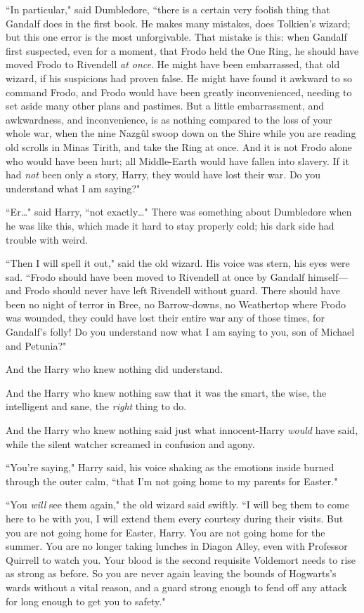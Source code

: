 ``In particular," said Dumbledore, ``there is a certain very foolish thing that Gandalf does in the first book. He makes many mistakes, does Tolkien's wizard; but this one error is the most unforgivable. That mistake is this: when Gandalf first suspected, even for a moment, that Frodo held the One Ring, he should have moved Frodo to Rivendell \emph{at once}. He might have been embarrassed, that old wizard, if his suspicions had proven false. He might have found it awkward to so command Frodo, and Frodo would have been greatly inconvenienced, needing to set aside many other plans and pastimes. But a little embarrassment, and awkwardness, and inconvenience, is as nothing compared to the loss of your whole war, when the nine Nazgûl swoop down on the Shire while you are reading old scrolls in Minas Tirith, and take the Ring at once. And it is not Frodo alone who would have been hurt; all Middle-Earth would have fallen into slavery. If it had \emph{not} been only a story, Harry, they would have lost their war. Do you understand what I am saying?"

``Er{\ldots}" said Harry, ``not exactly{\ldots}" There was something about Dumbledore when he was like this, which made it hard to stay properly cold; his dark side had trouble with weird.

``Then I will spell it out," said the old wizard. His voice was stern, his eyes were sad. ``Frodo should have been moved to Rivendell at once by Gandalf himself—and Frodo should never have left Rivendell without guard. There should have been no night of terror in Bree, no Barrow-downs, no Weathertop where Frodo was wounded, they could have lost their entire war any of those times, for Gandalf's folly! Do you understand now what I am saying to you, son of Michael and Petunia?"

And the Harry who knew nothing did understand.

And the Harry who knew nothing saw that it was the smart, the wise, the intelligent and sane, the \emph{right} thing to do.

And the Harry who knew nothing said just what innocent-Harry \emph{would} have said, while the silent watcher screamed in confusion and agony.

``You're saying," Harry said, his voice shaking as the emotions inside burned through the outer calm, ``that I'm not going home to my parents for Easter."

``You \emph{will} see them again," the old wizard said swiftly. ``I will beg them to come here to be with you, I will extend them every courtesy during their visits. But you are not going home for Easter, Harry. You are not going home for the summer. You are no longer taking lunches in Diagon Alley, even with Professor Quirrell to watch you. Your blood is the second requisite Voldemort needs to rise as strong as before. So you are never again leaving the bounds of Hogwarts's wards without a vital reason, and a guard strong enough to fend off any attack for long enough to get you to safety."

